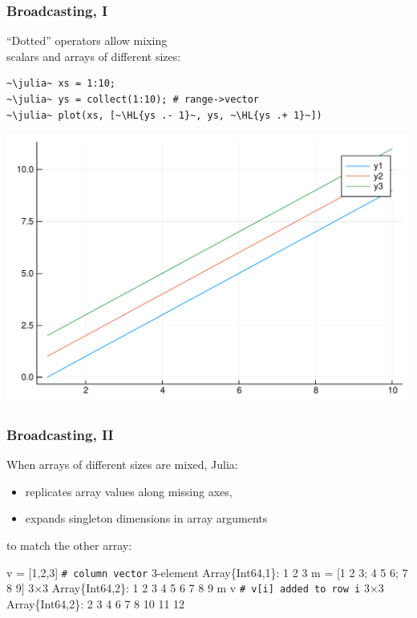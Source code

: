 \documentclass[english,serif,mathserif,xcolor=pdftex,dvipsnames,table]{beamer}
\begin{document}
\begin{frame}[fragile]
  \frametitle{Broadcasting, I}
  ``Dotted'' operators allow mixing \\ scalars and arrays of different sizes:
\begin{lstlisting}
~\julia~ xs = 1:10;
~\julia~ ys = collect(1:10); # range->vector
~\julia~ plot(xs, [~\HL{ys .- 1}~, ys, ~\HL{ys .+ 1}~])
\end{lstlisting}
  \begin{center}
    \includegraphics[height=0.50\textheight]{fig/plot5.pdf}
  \end{center}
\end{frame}


\begin{frame}[fragile]
  \frametitle{Broadcasting, II}
  \smaller
  When arrays of different sizes are mixed, Julia:
  \begin{itemize}
  \item \alert{replicates array values along missing axes,}
  \item expands singleton dimensions in array arguments
  \end{itemize}
  to match the other array:
\begin{semiverbatim}
\julia v = [1,2,3]  \lstinline|# column vector|
3-element Array\{Int64,1\}:
 1
 2
 3
\julia m = [1 2 3; 4 5 6; 7 8 9]
3×3 Array\{Int64,2\}:
 1  2  3
 4  5  6
 7  8  9
\julia m  v  \lstinline|# v[i] added to row i|
3×3 Array\{Int64,2\}:
  2   3   4
  6   7   8
 10  11  12
\end{semiverbatim}
\end{frame}
\end{document}
